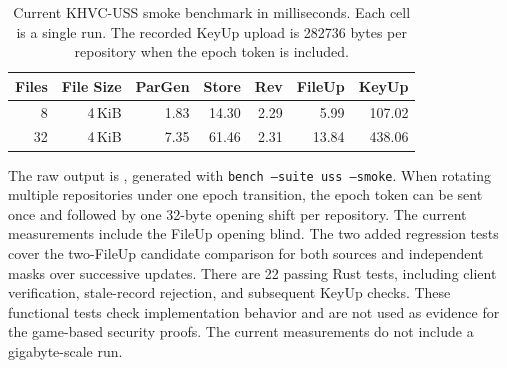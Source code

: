 \begin{table}[htbp]
\centering
\caption{Current KHVC-USS smoke benchmark in milliseconds. Each cell is a single run. The recorded KeyUp upload is 282736 bytes per repository when the epoch token is included.}
\label{tab:uss_micro}
\small
\begin{tabular}{@{}rrrrrrr@{}}
\toprule
Files & File Size & \textsf{ParGen} & \textsf{Store} & \textsf{Rev} & \textsf{FileUp} & \textsf{KeyUp} \\
\midrule
8 & 4\,KiB & 1.83 & 14.30 & 2.29 & 5.99 & 107.02 \\
32 & 4\,KiB & 7.35 & 61.46 & 2.31 & 13.84 & 438.06 \\
\bottomrule
\end{tabular}
\end{table}

The raw output is , generated with \texttt{bench --suite uss --smoke}. When rotating multiple repositories under one epoch transition, the epoch token can be sent once and followed by one 32-byte opening shift per repository. The current measurements include the FileUp opening blind. The two added regression tests cover the two-FileUp candidate comparison for both sources and independent masks over successive updates. There are 22 passing Rust tests, including client verification, stale-record rejection, and subsequent KeyUp checks. These functional tests check implementation behavior and are not used as evidence for the game-based security proofs. The current measurements do not include a gigabyte-scale run.

